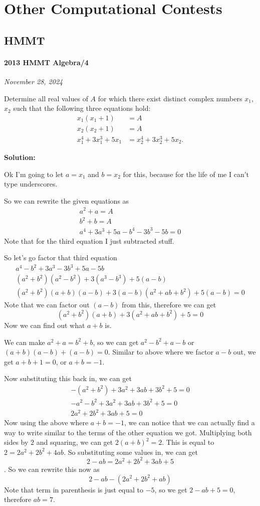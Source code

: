 \documentclass[../mathproblems.tex]{subfiles}
\begin{document}
\chapter{Other Computational Contests}
\section{HMMT}
\subsubsection*{2013 HMMT Algebra/4} 
\textit{November 28, 2024}

Determine all real values of $A$ for which there exist distinct complex numbers $x_1$, $x_2$ such that the following three equations hold:
\begin{align*}x_1(x_1+1)&=A\\x_2(x_2+1)&=A\\x_1^4+3x_1^3+5x_1&=x_2^4+3x_2^3+5x_2.\end{align*}

\textbf{Solution:}

Ok I'm going to let $a=x_1$ and $b=x_2$ for this, because for the life of me I can't type underscores.

So we can rewrite the given equations as
\begin{align*} a^2+a = A\\ b^2+b = A\\ a^4+3a^3+5a-b^4-3b^3-5b = 0 \end{align*}
Note that for the third equation I just subtracted stuff.

So let's go factor that third equation
\begin{align*} a^4-b^2+3a^3-3b^3+5a-5b\\ (a^2+b^2)(a^2-b^2)+3(a^3-b^3)+5(a-b)\\ (a^2+b^2)(a+b)(a-b)+3(a-b)(a^2+ab+b^2)+5(a-b)=0 \end{align*}
Note that we can factor out $(a-b)$ from this, therefore we can get
\[(a^2+b^2)(a+b)+3(a^2+ab+b^2)+5=0\]
Now we can find out what $a+b$ is.

We can make $a^2+a = b^2+b$, so we can get $a^2-b^2+a-b$ or $(a+b)(a-b)+(a-b)=0$. Similar to above where we factor $a-b$ out, we get $a+b+1=0$, or $a+b=-1$.

Now substituting this back in, we can get
\begin{align*} -(a^2+b^2)+3a^2+3ab+3b^2+5=0\\ -a^2-b^2+3a^2+3ab+3b^2+5=0\\ 2a^2+2b^2+3ab+5=0 \end{align*}
Now using the above where $a+b=-1$, we can notice that we can actually find a way to write similar to the terms of the other equation we got. Multiplying both sides by $2$ and squaring, we can get $2(a+b)^2=2$. This is equal to $2=2a^2+2b^2+4ab$. So substituting some values in, we can get \[2-ab=2a^2+2b^2+3ab + 5\]. So we can rewrite this now as
\[2-ab-(2a^2+2b^2+ab)\]Note that term in parenthesis is just equal to $-5$, so we get $2-ab+5 = 0$, therefore $ab=7$.
\end{document}
